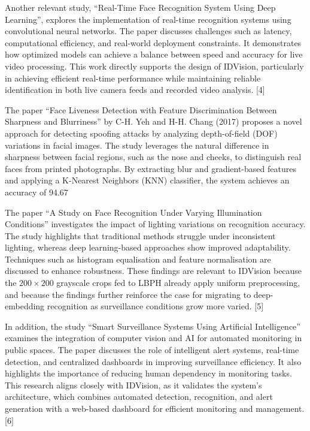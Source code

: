 \documentclass[11pt]{report}
\begin{document}
Another relevant study, “Real-Time Face Recognition System Using Deep Learning”, explores the implementation of real-time recognition systems using convolutional neural networks. The paper discusses challenges such as latency, computational efficiency, and real-world deployment constraints. It demonstrates how optimized models can achieve a balance between speed and accuracy for live video processing. This work directly supports the design of IDVision, particularly in achieving efficient real-time performance while maintaining reliable identification in both live camera feeds and recorded video analysis. [4]

The paper “Face Liveness Detection with Feature Discrimination Between Sharpness and Blurriness” by C-H. Yeh and H-H. Chang (2017) proposes a novel approach for detecting spoofing attacks by analyzing depth-of-field (DOF) variations in facial images. The study leverages the natural difference in sharpness between facial regions, such as the nose and cheeks, to distinguish real faces from printed photographs. By extracting blur and gradient-based features and applying a K-Nearest Neighbors (KNN) classifier, the system achieves an accuracy of 94.67%

The paper “A Study on Face Recognition Under Varying Illumination Conditions” investigates the impact of lighting variations on recognition accuracy. The study highlights that traditional methods struggle under inconsistent lighting, whereas deep learning-based approaches show improved adaptability. Techniques such as histogram equalisation and feature normalisation are discussed to enhance robustness. These findings are relevant to IDVision because the $200\times200$ grayscale crops fed to LBPH already apply uniform preprocessing, and because the findings further reinforce the case for migrating to deep-embedding recognition as surveillance conditions grow more varied. [5]

In addition, the study “Smart Surveillance Systems Using Artificial Intelligence” examines the integration of computer vision and AI for automated monitoring in public spaces. The paper discusses the role of intelligent alert systems, real-time detection, and centralized dashboards in improving surveillance efficiency. It also highlights the importance of reducing human dependency in monitoring tasks. This research aligns closely with IDVision, as it validates the system’s architecture, which combines automated detection, recognition, and alert generation with a web-based dashboard for efficient monitoring and management. [6]
\end{document}
